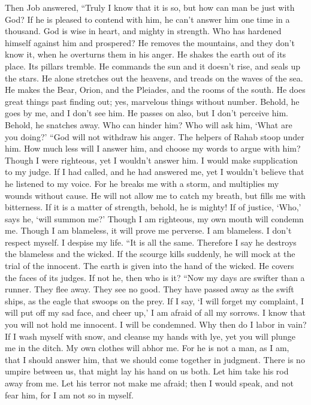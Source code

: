  Then Job answered,  ``Truly I know that it
is so, but how can man be just with God?  If he is pleased
to contend with him, he can't answer him one time in a thousand.
 God is wise in heart, and mighty in strength. Who has
hardened himself against him and prospered?  He removes
the mountains, and they don't know it, when he overturns them in his
anger.  He shakes the earth out of its place. Its pillars
tremble.  He commands the sun and it doesn't rise, and
seals up the stars.  He alone stretches out the heavens,
and treads on the waves of the sea.  He makes the Bear,
Orion, and the Pleiades, and the rooms of the south.  He
does great things past finding out; yes, marvelous things without
number.  Behold, he goes by me, and I don't see him. He
passes on also, but I don't perceive him.  Behold, he
snatches away. Who can hinder him? Who will ask him, `What are you
doing?'  ``God will not withdraw his anger. The helpers
of Rahab stoop under him.  How much less will I answer
him, and choose my words to argue with him?  Though I
were righteous, yet I wouldn't answer him. I would make supplication to
my judge.  If I had called, and he had answered me, yet I
wouldn't believe that he listened to my voice.  For he
breaks me with a storm, and multiplies my wounds without cause.
 He will not allow me to catch my breath, but fills me
with bitterness.  If it is a matter of strength, behold,
he is mighty! If of justice, `Who,' says he, `will summon me?'
 Though I am righteous, my own mouth will condemn me.
Though I am blameless, it will prove me perverse.  I am
blameless. I don't respect myself. I despise my life. 
``It is all the same. Therefore I say he destroys the blameless and the
wicked.  If the scourge kills suddenly, he will mock at
the trial of the innocent.  The earth is given into the
hand of the wicked. He covers the faces of its judges. If not he, then
who is it?  ``Now my days are swifter than a runner. They
flee away. They see no good.  They have passed away as
the swift ships, as the eagle that swoops on the prey. 
If I say, `I will forget my complaint, I will put off my sad face, and
cheer up,'  I am afraid of all my sorrows. I know that
you will not hold me innocent.  I will be condemned. Why
then do I labor in vain?  If I wash myself with snow, and
cleanse my hands with lye,  yet you will plunge me in the
ditch. My own clothes will abhor me.  For he is not a
man, as I am, that I should answer him, that we should come together in
judgment.  There is no umpire between us, that might lay
his hand on us both.  Let him take his rod away from me.
Let his terror not make me afraid;  then I would speak,
and not fear him, for I am not so in myself.

